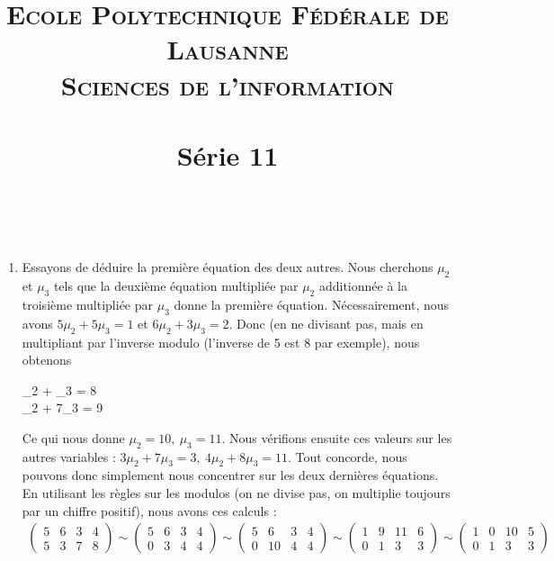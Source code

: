 \documentclass[10p,a4paper]{scrartcl}
\title{	
\normalfont \normalsize 
\textsc{Ecole Polytechnique Fédérale de Lausanne} \\ [25pt] %
\textsc{Sciences de l'information}\\ [0pt] %
\horrule{0.5pt} \\[0.4cm] %
\huge Série 11 \\ %
\horrule{2pt} \\[0.5cm] %
}
\date{}
\renewcommand{\(}{\left(}
\renewcommand{\)}{\right)}
\begin{document}
\maketitle
\setcounter{section}{11}
\subsection{}
\begin{enumerate}

	\item	Essayons de déduire la première équation des deux autres. Nous cherchons $\mu_2$ et $\mu_3$ tels que la deuxième équation multipliée par $\mu_2$ additionnée à la troisième multipliée par $\mu_3$ donne la première équation.
Nécessairement, nous avons $5\mu_2 + 5\mu_3 = 1$ et $6\mu_2 + 3\mu_3 = 2$. Donc (en ne divisant pas, mais en multipliant par l'inverse modulo (l'inverse de 5 est 8 par exemple), nous obtenons 
			\begin{systeq}
					\mu_2 + \mu_3 = 8\\
					\mu_2 + 7\mu_3 = 9
			\end{systeq}
			Ce qui nous donne $\mu_2 = 10,\ \mu_3 = 11$. Nous vérifions ensuite ces valeurs sur les autres variables : $3\mu_2 + 7\mu_3 = 3,\ 4\mu_2 + 8\mu_3 = 11$. Tout concorde, nous pouvons donc simplement nous concentrer sur les deux dernières équations. En utilisant les règles sur les modulos (on ne divise pas, on multiplie toujours par un chiffre positif), nous avons ces calculs :
			\begin{align*}
				\begin{pmatrix}
					5 & 6 & 3 & 4\\
					5 & 3 & 7 & 8
				\end{pmatrix}
				\sim
				\begin{pmatrix}
					5 & 6 & 3 & 4\\
					0 & 3 & 4 & 4
				\end{pmatrix}
				\sim
				\begin{pmatrix}
					5 & 6 & 3 & 4\\
					0 & 10 & 4 & 4
				\end{pmatrix}		
				\sim
				\begin{pmatrix}
					1 & 9 & 11 & 6\\
					0 & 1 & 3 & 3
				\end{pmatrix}
				\sim
				\begin{pmatrix}
					1 & 0 & 10 & 5\\
					0 & 1 & 3 & 3
				\end{pmatrix}\\

\end{align*}
\end{enumerate}
\end{document}
